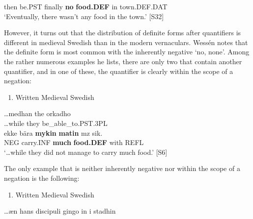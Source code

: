 then  be.PST  finally  \textbf{no} \textbf{food.DEF} in  town.DEF.DAT\\ %


‘Eventually, there wasn’t any food in the town.’ [S32]
\z

However, it turns out that the distribution of definite forms after quantifiers is different in medieval Swedish than in the modern vernaculars. Wessén notes that the definite form is most common with the inherently negative  ‘no, none’. Among the rather numerous examples he lists, there are only two that contain another quantifier, and in one of these, the quantifier is clearly within the scope of a negation: 

\begin{enumerate} %
\item 
Written Medieval Swedish

\end{enumerate} %
\ea\label{}
\gll …medhan  the  orkadho\\


…while  they  be\_able\_to.PST.3PL\\ %


\ea\label{}
\gll ekke  bära  \textbf{mykin}\textbf{  matin} mz  sik.\\


NEG  carry.INF  \textbf{much} \textbf{food.DEF} with  REFL\\ %


 ‘…while they did not manage to carry much food.’ [S6]
\z

The only example that is neither inherently negative nor within the scope of a negation is the following:

\begin{enumerate} %
\item 
\label{bkm:Ref78603365}Written Medieval Swedish

\end{enumerate} %
\ea\label{}
\gll …æn  hans  discipuli  gingo  in  i  stadhin\\


